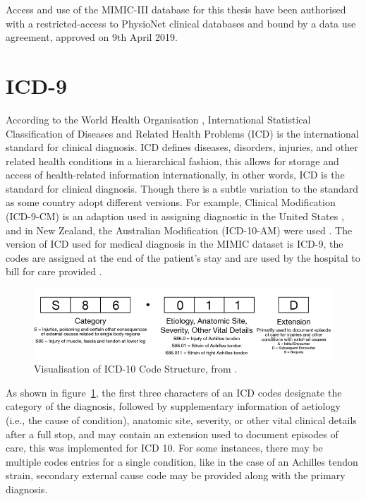 \newpara

Access and use of the MIMIC-III database for this thesis have been authorised with a restricted-access to PhysioNet clinical databases and bound by a data use agreement, approved on 9th April 2019. 

\section{ICD-9}

According to the World Health Organisation \citep{WHO2019}, International Statistical Classification of Diseases and Related Health Problems (ICD) is the international standard for clinical diagnosis. ICD defines diseases, disorders, injuries, and other related health conditions in a hierarchical fashion, this allows for storage and access of health-related information internationally, in other words, ICD is the standard for clinical diagnosis. Though there is a subtle variation to the standard as some country adopt different versions. For example, Clinical Modification (ICD-9-CM) is an adaption used in assigning diagnostic in the United States \citep{CDC2019}, and in New Zealand, the Australian Modification (ICD-10-AM) were used \citep{MoH2019}. The version of ICD used for medical diagnosis in the MIMIC dataset is ICD-9, the codes are assigned at the end of the patient’s stay and are used by the hospital to bill for care provided \citep{johnson2016mimic}.

\newpara

\begin{figure}[h]
	\centering
	\includegraphics[width=0.7\linewidth]{Figures/icd-10-code}
	\caption{Visualisation of ICD-10 Code Structure, from \cite{Andrus2013}.}
	\label{fig:icd10code}
\end{figure}

As shown in figure~\ref{fig:icd10code}, the first three characters of an ICD codes designate the category of the diagnosis, followed by supplementary information of aetiology (i.e., the cause of condition), anatomic site, severity, or other vital clinical details after a full stop, and may contain an extension used to document episodes of care, this was implemented for ICD 10. For some instances, there may be multiple codes entries for a single condition, like in the case of an Achilles tendon strain, secondary external cause code may be provided along with the primary diagnosis. 

